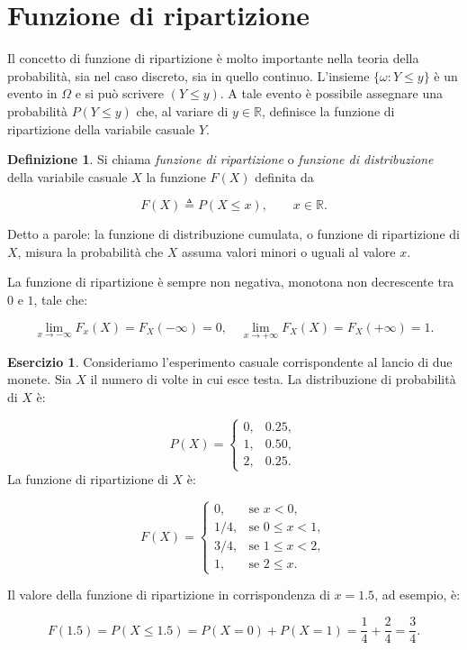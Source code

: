 \documentclass[
  11pt,
]{krantz}
\theoremstyle{definition}
\newtheorem{definition}{Definizione}[chapter]
\theoremstyle{definition}
\theoremstyle{definition}
\newtheorem{exercise}{Esercizio}[chapter]
\theoremstyle{definition}
\theoremstyle{remark}
\begin{document}
\hypertarget{funzione-di-ripartizione}{%
\section{Funzione di ripartizione}\label{funzione-di-ripartizione}}

Il concetto di funzione di ripartizione è molto importante nella teoria della probabilità, sia nel caso discreto, sia in quello continuo. L'insieme \(\{\omega: Y \leq y\}\) è un evento in \(\Omega\) e si può scrivere \((Y \leq y)\). A tale evento è possibile assegnare una probabilità \(P(Y \leq y)\) che, al variare di \(y \in \mathbb{R}\), definisce la funzione di ripartizione della variabile casuale \(Y\).

\begin{definition}
Si chiama \emph{funzione di ripartizione} o \emph{funzione di distribuzione} della variabile casuale \(X\) la funzione \(F(X)\) definita da

\begin{equation}
F(X) \triangleq P(X \le x), \qquad x \in \mathbb{R}.
\label{eq:funrip}
\end{equation}
\end{definition}

Detto a parole: la funzione di distribuzione cumulata, o funzione di ripartizione di \(X\), misura la probabilità che \(X\) assuma valori minori o uguali al valore \(x\).

La funzione di ripartizione è sempre non negativa, monotona non decrescente tra \(0\) e \(1\), tale che:

\[
\lim_{x \to -\infty} F_x(X) = F_X(-\infty) = 0, \quad \lim_{x \to +\infty} F_X(X) = F_X(+\infty) = 1.
\]

\begin{exercise}
Consideriamo l'esperimento casuale corrispondente al lancio di due monete. Sia \(X\) il numero di volte in cui esce testa. La distribuzione di probabilità di \(X\) è:

\[
P(X) = 
\begin{cases}
    0, & 0.25,\\
    1, & 0.50,\\
    2, & 0.25.
\end{cases}
\] La funzione di ripartizione di \(X\) è:

\[
    F(X) = 
\begin{cases}
    0,   & \text{se } x < 0,\\
    1/4, & \text{se } 0 \leq x < 1,\\
    3/4, & \text{se } 1 \leq x < 2,\\
     1,  & \text{se } 2 \leq x.
\end{cases}
\]

Il valore della funzione di ripartizione in corrispondenza di \(x = 1.5\), ad esempio, è:

\[
F(1.5) = P(X \leq 1.5) = P(X=0) + P(X=1) = \frac{1}{4} + \frac{2}{4} = \frac{3}{4}.
\]
\end{exercise}
\end{document}
